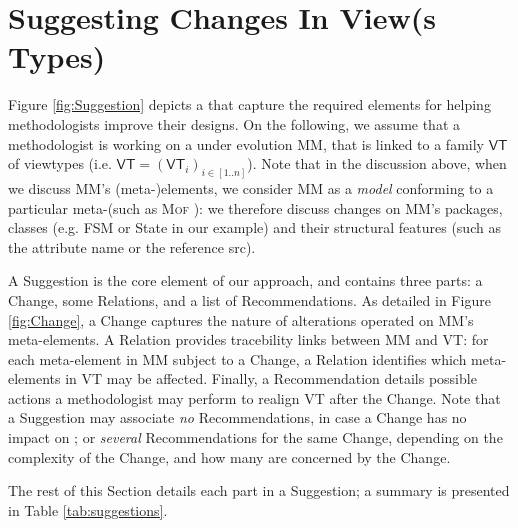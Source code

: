 \section{Suggesting Changes In View(s Types)}
\label{sec:Suggestion}

Figure \ref{fig:Suggestion} depicts a \metamodel that capture the
required elements for helping methodologists improve their designs.
On the following, we assume that a methodologist is working on a \metamodel
under evolution \textsf{MM}, that is linked to a family $\mathsf{VT}$ of viewtypes
(i.e. $\mathsf{VT} = (\mathsf{VT}_i)_{i\in [1..n]}$). Note that in the discussion above, when we discuss
\textsf{MM}'s (meta-)elements, we consider \textsf{MM} as a \emph{model}
conforming to a particular meta-\metamodel (such as \textsc{Mof} \cite{TR:OMG-MOF:2016}):
we therefore discuss changes on \textsf{MM}'s packages, classes (e.g. 
\textsf{FSM} or \textsf{State} in our example) and their structural features
(such as the attribute \textsf{name} or the reference \textsf{src}).

A \textsf{Suggestion} is the core element of our approach, and contains three 
parts: a \textsf{Change}, some \textsf{Relation}s, and a list of 
\textsf{Recommendation}s. 
%
As detailed in Figure \ref{fig:Change}, a \textsf{Change} captures the nature of
alterations operated on \textsf{MM}'s meta-elements. 
A \textsf{Relation} provides tracebility links between \textsf{MM} and \textsf{VT}:
for each meta-element in \textsf{MM} subject to a \textsf{Change}, a \textsf{Relation}
identifies which meta-elements in \textsf{VT} may be affected. 
Finally, a \textsf{Recommendation} details possible actions a methodologist may 
perform to realign \textsf{VT} after the \textsf{Change}. 
Note that a \textsf{Suggestion} may 
associate \emph{no} \textsf{Recommendation}s, in case a \textsf{Change} has no
impact on \viewtypes; or \emph{several} \textsf{Recommendation}s for the same 
\textsf{Change}, depending on the complexity of the \textsf{Change}, and how 
many \viewtypes are concerned by the \textsf{Change}.

The rest of this Section details each part in a \textsf{Suggestion}; a summary
is presented in Table \ref{tab:suggestions}.





